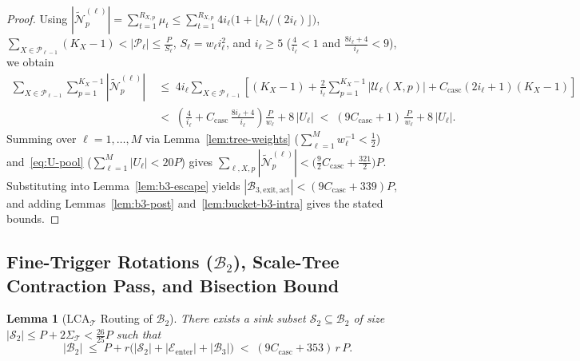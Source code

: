 \documentclass[11pt]{article}
\newtheorem{lemma}[theorem]{Lemma}
\theoremstyle{definition}
\theoremstyle{remark}
\newcommand{\LCA}{\mathrm{LCA}}
\begin{document}
\begin{proof}
Using $|\widetilde{\mathcal{N}}_p^{(\ell)}| = \sum_{t=1}^{R_{X, p}} \mu_t \le \sum_{t=1}^{R_{X, p}} 4 i_\ell\big(1 + \lfloor k_t / (2 i_\ell) \rfloor\big)$, $\sum_{X \in \mathcal{P}_{\ell-1}} (K_X - 1) < |\mathcal{P}_\ell| \le \frac{P}{S_\ell}$, $S_\ell = w_\ell i_\ell^2$, and $i_\ell \ge 5$ ($\frac{4}{i_\ell} < 1$ and $\frac{8 i_\ell + 4}{i_\ell} < 9$), we obtain
\begin{align*}
\sum_{X \in \mathcal{P}_{\ell-1}} \sum_{p=1}^{K_X - 1} |\widetilde{\mathcal{N}}_p^{(\ell)}|
&\;\le\; 4 i_\ell \sum_{X \in \mathcal{P}_{\ell-1}} \left[(K_X - 1) + \frac{2}{i_\ell}\sum_{p=1}^{K_X - 1} |\mathcal{U}_\ell(X, p)| + C_{\mathrm{casc}}(2 i_\ell + 1)(K_X - 1)\right]\\
&\;<\; \left(\frac{4}{i_\ell} + C_{\mathrm{casc}}\,\frac{8 i_\ell + 4}{i_\ell}\right)\frac{P}{w_\ell} + 8\,|U_\ell|
\;<\; (9 C_{\mathrm{casc}} + 1)\,\frac{P}{w_\ell} + 8\,|U_\ell|.
\end{align*}
Summing over $\ell = 1, \dots, M$ via Lemma~\ref{lem:tree-weights} ($\sum_{\ell=1}^M w_\ell^{-1} < \frac{1}{2}$) and~\eqref{eq:U-pool} ($\sum_{\ell=1}^M |U_\ell| < 20 P$) gives $\sum_{\ell, X, p} |\widetilde{\mathcal{N}}_p^{(\ell)}| < \big(\frac{9}{2} C_{\mathrm{casc}} + \frac{321}{2}\big) P$. Substituting into Lemma~\ref{lem:b3-escape} yields $|\mathcal{B}_{3,\mathrm{exit,act}}| < (9 C_{\mathrm{casc}} + 339) P$, and adding Lemmas~\ref{lem:b3-post} and~\ref{lem:bucket-b3-intra} gives the stated bounds.
\end{proof}


\subsection{Fine-Trigger Rotations (\texorpdfstring{$\mathcal{B}_2$}{B2}), Scale-Tree Contraction Pass, and Bisection Bound}
\label{subsec:b2-master}

\begin{lemma}[$\LCA_{\mathcal{T}}$ Routing of $\mathcal{B}_2$]
\label{lem:bucket-b2}
There exists a sink subset $\mathcal{S}_2 \subseteq \mathcal{B}_2$ of size $|\mathcal{S}_2| \le P + 2\Sigma_{\mathcal{T}} < \frac{26}{25} P$ such that
\[
|\mathcal{B}_2| \;\le\; P + r\big(|\mathcal{S}_2| + |\mathcal{E}_{\mathrm{enter}}| + |\mathcal{B}_3|\big) \;<\; (9 C_{\mathrm{casc}} + 353)\,r\,P.
\]
\end{lemma}
\end{document}

